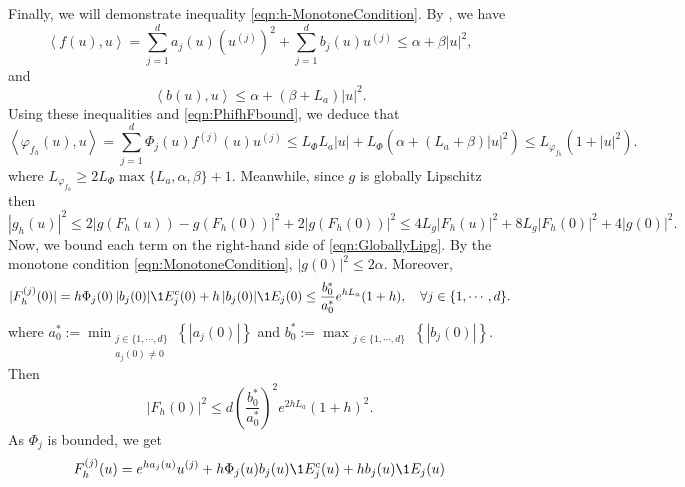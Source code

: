 \documentclass[sort&compress, preprint]{elsarticle}
\theoremstyle{definition}
\theoremstyle{plain}%
\theoremstyle{remark}
\newcommand{\innerprod}[2]{\left\langle#1, #2\right\rangle}
\begin{document}
\begin{pf}
	Finally, we  will demonstrate inequality \eqref{eqn:h-MonotoneCondition}. 
	By , we have
	\begin{equation*}\label{eqn:bDotProdBound}
			\innerprod{f(u)}{u}
			=
			\sum_{j=1}^d
				a_j(u) \left( u^{(j)} \right)^2
			+
			\sum_{j=1}^d
			b_j(u) u^{(j)}
			\leq \alpha +\beta |u|^2,
	\end{equation*}
	and
		\begin{equation*}\label{eqn:bDotProdBound}
			\innerprod{b(u)}{u} \leq \alpha + (\beta + L_a)|u|^2.
		\end{equation*}
	Using these inequalities and \eqref{eqn:PhifhFbound}, we deduce that
	\begin{equation}\label{eqn:VarphifhDotProdBound}
			\innerprod{\varphi_{f_h}(u)}{u} 
				=\sum_{j=1}^d
						\Phi_j(u) f^{(j)}(u) u^{(j)}
				\leq L_{\Phi} L_a|u| +  L_{\Phi}(\alpha + (L_a + \beta)|u|^2) \leq
				L_{\varphi_{f_h}} (1+|u|^2).					
		\end{equation}
	where
	$
		L_{\varphi_{f_h}}\geq 2 L_{\Phi}\max\{L_a, \alpha, \beta\} + 1.
	$ 
	Meanwhile, since $g$ is globally Lipschitz then
	\begin{equation}\label{eqn:GloballyLipg}
		|g_h(u)|^2 
		\leq
			2 |g(F_h(u)) - g(F_h(0))|^2  + 2 | g(F_h(0))|^2 \leq
			4 L_g |F_h(u)|^2  + 8 L_g |F_h(0)|^2  + 4 |g(0)|^2 .
	\end{equation}
	Now, we bound each term on the right-hand side of  \eqref{eqn:GloballyLipg}.
	By the monotone condition \eqref{eqn:MonotoneCondition}, $|g(0)|^2 \leq 2\alpha$.
	Moreover,
	\begin{equation*}
		|F_h^{(j)} (0) |=
			h\Phi_j(0)\,| b_j(0)| \1{E_j^c}(0) + 
			h\,|b_j(0)| \1{E_j}(0)
			\leq
			\frac{b_0^*}{a_0^*}
			e^{h L_a} (1+h),
			\quad
			\forall j \in \{1, \cdots, d\}.
	\end{equation*}
	where
	$a^*_0 := 
			\min_{
				\substack{
					j \in \{1, \cdots, d \}\\
					a_j(0) \neq 0
				}
			}
			\left\{
				|a_j(0)|
			\right\}$
 and 
		$b^*_0 :=
			\max_{\substack{
				j\in \{1,\cdots, d\}}
			}
			\left\{
				|b_j(0)|
			\right\}.$
	Then
	\begin{equation} \label{eqn:BoundFhZero}
		|F_h(0)|^2 
			\leq
			d\left(
				\frac{b_0^*}{a_0^*}
			\right)^2
		e^{2h L_a} (1+h)^2.
	\end{equation}
	As $\Phi_j$ is bounded, we get
	\begin{dmath*}
		F_h^{(j)}(u) 
			=
			e^{h a_j(u)} u^{(j)} +
			h \Phi_j(u) b_j(u) \1{E_j^c}(u) +h b_j(u) \1{E_j}(u)

\end{dmath*}
\end{pf}
\end{document}
